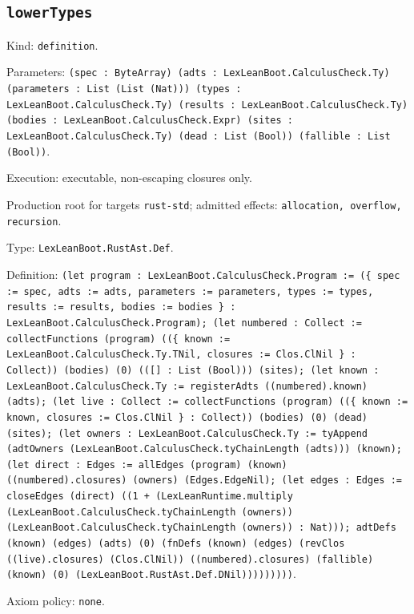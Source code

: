 \documentclass[11pt]{article}
\begin{document}
\subsection*{\texttt{lowerTypes}}
\noindent Kind: \texttt{definition}.\par
\noindent Parameters: \texttt{(spec : ByteArray) (adts : LexLeanBoot.CalculusCheck.Ty) (parameters : List (List (Nat))) (types : LexLeanBoot.CalculusCheck.Ty) (results : LexLeanBoot.CalculusCheck.Ty) (bodies : LexLeanBoot.CalculusCheck.Expr) (sites : LexLeanBoot.CalculusCheck.Ty) (dead : List (Bool)) (fallible : List (Bool))}.\par
\noindent Execution: executable, non-escaping closures only.\par
\noindent Production root for targets \texttt{rust-std}; admitted effects: \texttt{allocation, overflow, recursion}.\par
\noindent Type: \texttt{LexLeanBoot.RustAst.Def}.\par
\noindent Definition: \texttt{(let program : LexLeanBoot.CalculusCheck.Program := (\{ spec := spec, adts := adts, parameters := parameters, types := types, results := results, bodies := bodies \} : LexLeanBoot.CalculusCheck.Program); (let numbered : Collect := collectFunctions (program) ((\{ known := LexLeanBoot.CalculusCheck.Ty.TNil, closures := Clos.ClNil \} : Collect)) (bodies) (0) (([] : List (Bool))) (sites); (let known : LexLeanBoot.CalculusCheck.Ty := registerAdts ((numbered).known) (adts); (let live : Collect := collectFunctions (program) ((\{ known := known, closures := Clos.ClNil \} : Collect)) (bodies) (0) (dead) (sites); (let owners : LexLeanBoot.CalculusCheck.Ty := tyAppend (adtOwners (LexLeanBoot.CalculusCheck.tyChainLength (adts))) (known); (let direct : Edges := allEdges (program) (known) ((numbered).closures) (owners) (Edges.EdgeNil); (let edges : Edges := closeEdges (direct) ((1 + (LexLeanRuntime.multiply (LexLeanBoot.CalculusCheck.tyChainLength (owners)) (LexLeanBoot.CalculusCheck.tyChainLength (owners)) : Nat))); adtDefs (known) (edges) (adts) (0) (fnDefs (known) (edges) (revClos ((live).closures) (Clos.ClNil)) ((numbered).closures) (fallible) (known) (0) (LexLeanBoot.RustAst.Def.DNil)))))))))}.\par
\noindent Axiom policy: \texttt{none}.\par
\end{document}
